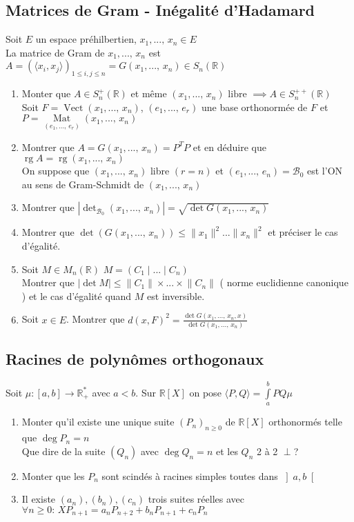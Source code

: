 \documentclass[10pt,a4paper]{article}
\theoremstyle{definition}
\DeclareMathOperator*{\mat}{Mat}
\DeclareMathOperator{\rg}{rg}
\DeclareMathOperator{\vect}{Vect}
\begin{document}
\subsection{Matrices de Gram - Inégalité d'Hadamard}
\noindent Soit \(E\) un espace préhilbertien, \(x_1, ...,\, x_n \in E\) \\
La matrice de Gram de \(x_1, ...,\, x_n\) est \(A = (\langle x_i, x_j \rangle)_{1 \leq i, j \leq n} = G(x_1, ...,\, x_n) \in S_n(\mathbb{R})\)
\begin{enumerate}
    \item Monter que \(A \in S_n^+(\mathbb{R})\) et même \((x_1, ...,\, x_n) \text{ libre } \implies A \in S_n^{++}(\mathbb{R})\) \\
    Soit \(F = \vect(x_1, ...,\, x_n)\), \((e_1, ...,\, e_r)\) une base orthonormée de \(F\) et \(P = \mat\limits_{(e_1, ...,\, e_r)}(x_1, ...,\, x_n)\)
    \item Montrer que \(A = G(x_1, ...,\, x_n) = P^T P\) et en déduire que \(\rg A = \rg(x_1, ...,\, x_n)\) \\
    On suppose que \((x_1, ...,\, x_n)\) libre \((r = n)\) et \((e_1, ...,\, e_n) = \mathcal{B}_0\) est l'ON au sens de Gram-Schmidt de \((x_1, ...,\, x_n)\)
    \item Montrer que \(|\det_{\mathcal{B}_0}(x_1, ...,\, x_n )| = \sqrt{\det G(x_1, ...,\, x_n)}\)
    \item Montrer que \(\det(G(x_1, ...,\, x_n)) \leq \lVert x_1 \rVert^2 ... \lVert x_n \rVert^2\) et préciser le cas d'égalité.
    \item Soit \(M \in M_n(\mathbb{R})\) \(M = \left( C_1 \mid ... \mid C_n\right)\) \\
    Montrer que \(|\det M| \leq \lVert C_1 \rVert \times ... \times \lVert C_n \rVert\) ( norme euclidienne canonique ) et le cas d’égalité quand \(M\) est inversible.
    \item Soit \(x \in E\). Montrer que \(d(x, F)^2 = \frac{\det G(x_1, ...,\, x_n, x)}{\det G(x_1, ...,\, x_n)}\)
\end{enumerate}

\subsection{Racines de polynômes orthogonaux}
\noindent Soit \(\mu: [a, b] \to \mathbb{R}_+^*\) avec \(a < b\). Sur \(\mathbb{R}[X]\) on pose \(\langle P, Q \rangle = \int\limits_{a}^{b} PQ \mu\)
\begin{enumerate}
    \item Monter qu'il existe une unique suite \((P_n)_{n \geq 0}\) de \(\mathbb{R}[X]\) orthonormés telle que \(\deg P_n = n\) \\
    Que dire de la suite \((Q_n)\) avec \(\deg Q_n = n\) et les \(Q_n\) 2 à 2 \(\perp\)?
    \item Monter que les \(P_n\) sont scindés à racines simples toutes dans \(\left] a, b \right[\)
    \item Il existe \((a_n),(b_n),(c_n)\) trois suites réelles avec \(\forall n \geq 0 :\, X P_{n + 1} = a_n P_{n + 2} + b_n P_{n + 1} + c_n P_n\)
\end{enumerate}
\end{document}
